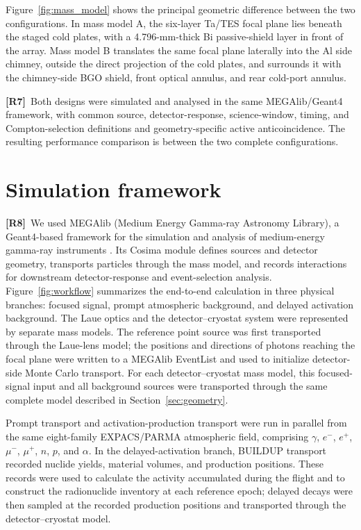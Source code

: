 \documentclass[11pt]{article}
\newcommand{\revmark}[1]{\textcolor{revisionblue}{\textbf{[R#1]}}\ }
\newcommand{\revblue}[1]{\textcolor{revisionblue}{#1}}
\begin{document}
\begingroup
\color{revisionblue}
Figure~\ref{fig:mass_model} shows the principal geometric difference between the
two configurations. In mass model A, the six-layer Ta/TES focal plane lies
beneath the staged cold plates, with a 4.796-mm-thick Bi passive-shield layer in
front of the array. Mass model B translates the same focal plane laterally into
the Al side chimney, outside the direct projection of the cold plates, and
surrounds it with the chimney-side BGO shield, front optical annulus, and rear
cold-port annulus.
\par
\endgroup

\revmark{7}Both designs were simulated and analysed in the same MEGAlib/Geant4
framework, with common source, detector-response, science-window, timing, and
Compton-selection definitions and geometry-specific active anticoincidence.
The resulting performance comparison is between the two complete configurations.

\FloatBarrier

\section{Simulation framework}
\label{sec:framework}

\revmark{8}We used MEGAlib (Medium Energy Gamma-ray Astronomy Library), a
Geant4-based framework for the simulation and analysis of medium-energy
gamma-ray instruments \cite{Zoglauer2006,Agostinelli2003,Allison2016}. Its
Cosima module defines sources and detector geometry, transports particles
through the mass model, and records interactions for downstream detector-response
and event-selection analysis. Figure~\ref{fig:workflow} summarizes the end-to-end
calculation in three physical branches: focused signal, prompt atmospheric
background, and delayed activation background. The Laue optics and the
detector--cryostat system were represented by separate mass models. The
reference point source was first transported through the Laue-lens model; the
positions and directions of photons reaching the focal plane were written to a
MEGAlib EventList and used to initialize detector-side Monte Carlo transport.
For each detector--cryostat mass model, this focused-signal input and all
background sources were transported through the same complete model described
in Section~\ref{sec:geometry}.

Prompt transport and activation-production transport were run in parallel from
the same \revblue{eight-family EXPACS/PARMA atmospheric field, comprising
$\gamma$, $e^-$, $e^+$, $\mu^-$, $\mu^+$, $n$, $p$, and $\alpha$}. In
the delayed-activation branch, BUILDUP transport recorded nuclide yields,
material volumes, and production positions. These records were used to
calculate the activity accumulated during the flight and to construct the
radionuclide inventory at each reference epoch; delayed decays were then
sampled at the recorded production positions and transported through the
detector--cryostat model.
\end{document}
